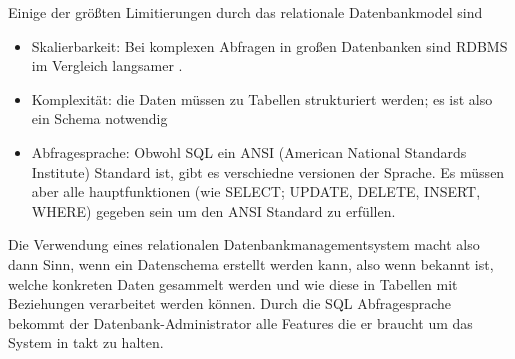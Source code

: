 Einige der größten Limitierungen \cite{MELD.CH2-relationaleDB.rdbmsBuch} durch das relationale Datenbankmodel sind
\begin{itemize}
\item Skalierbarkeit: Bei komplexen Abfragen in großen Datenbanken sind RDBMS im Vergleich langsamer \cite{MELD.CH2-relationaleDB.performacne}.
\item Komplexität: die Daten müssen zu Tabellen strukturiert werden; es ist also ein Schema notwendig
\item Abfragesprache: Obwohl SQL ein ANSI (American National Standards Institute) Standard ist, gibt es verschiedne versionen der Sprache. Es müssen aber alle hauptfunktionen (wie SELECT; UPDATE, DELETE, INSERT, WHERE) gegeben sein um den ANSI Standard zu erfüllen.
\end{itemize}

Die Verwendung eines relationalen Datenbankmanagementsystem macht also dann Sinn, wenn ein Datenschema erstellt werden kann, also wenn bekannt ist, welche konkreten Daten gesammelt werden und wie diese in Tabellen mit Beziehungen verarbeitet werden können. Durch die SQL Abfragesprache bekommt der Datenbank-Administrator alle Features die er braucht um das System in takt zu halten.